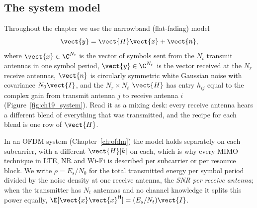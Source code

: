 \subsection{The system model}

Throughout the chapter we use the narrowband (flat-fading) model
\begin{equation}
\vect{y}=\vect{H}\vect{x}+\vect{n},
\label{eq:ch19:model}
\end{equation}
where $\vect{x}\in\C^{N_t}$ is the vector of symbols sent from the $N_t$ transmit antennas in one
symbol period, $\vect{y}\in\C^{N_r}$ is the vector received at the $N_r$ receive antennas,
$\vect{n}$ is circularly symmetric white Gaussian noise with covariance $N_0\vect{I}$, and the
$N_r\times N_t$  $\vect{H}$ has entry $h_{ij}$ equal to the complex gain from
transmit antenna $j$ to receive antenna $i$ (Figure~\ref{fig:ch19_system}). Read it as a mixing
desk: every receive antenna hears a different blend of everything that was transmitted, and the
recipe for each blend is one row of $\vect{H}$.

In an OFDM system (Chapter~\ref{ch:ofdm}) the model holds separately on each subcarrier, with a
different $\vect{H}[k]$ on each, which is why every MIMO technique in LTE, NR and Wi-Fi is described
per subcarrier or per resource block. We write $\rho=E_s/N_0$ for the total transmitted energy per
symbol period divided by the noise density at one receive antenna, the \emph{SNR per receive
antenna}; when the transmitter has $N_t$ antennas and no channel knowledge it splits this power
equally, $\E[\vect{x}\vect{x}^{\mathsf H}]=(E_s/N_t)\vect{I}$.

